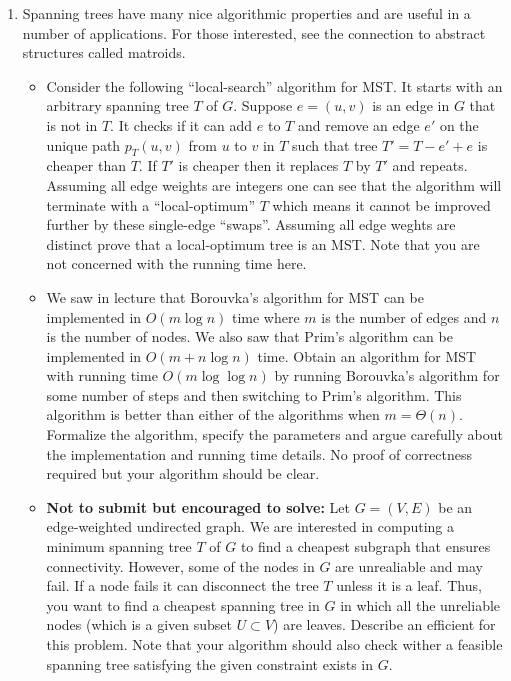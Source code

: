 \documentclass[11pt]{article}
\begin{document}
\vspace{1cm}

\begin{enumerate}



\item Spanning trees have many nice algorithmic properties and are useful
  in a number of applications. For those interested, see the connection
  to abstract structures called matroids.
  \begin{itemize}
  \item Consider the following ``local-search'' algorithm for MST.  It
    starts with an arbitrary spanning tree $T$ of $G$. Suppose
    $e=(u,v)$ is an edge in $G$ that is not in $T$. It checks if it
    can add $e$ to $T$ and remove an edge $e'$ on the unique path
    $p_T(u,v)$ from $u$ to $v$ in $T$ such that tree $T' = T - e' + e$
    is cheaper than $T$.  If $T'$ is cheaper then it replaces $T$ by
    $T'$ and repeats. Assuming all edge weights are integers one can
    see that the algorithm will terminate with a ``local-optimum'' $T$
    which means it cannot be improved further by these single-edge
    ``swaps''.  Assuming all edge weghts are distinct prove that a
    local-optimum tree is an MST. Note that you are not concerned with
    the running time here.
  \item We saw in lecture that Borouvka's algorithm for MST can be
  implemented in $O(m \log n)$ time where $m$ is the number of edges
  and $n$ is the number of nodes. We also saw that Prim's algorithm
  can be implemented in $O(m + n \log n)$ time.
  Obtain an algorithm
    for MST with running time $O(m \log \log n)$ by running Borouvka's
    algorithm for some number of steps and then switching to Prim's
    algorithm. This algorithm is better than either of the algorithms
    when $m = \Theta(n)$. Formalize the algorithm, specify the
    parameters and argue carefully about the implementation and running
    time details. No proof of correctness required but your algorithm should be
    clear.

\item {\bf Not to submit but encouraged to solve:} Let $G=(V,E)$ be an edge-weighted undirected graph.  We are
  interested in computing a minimum spanning tree $T$ of $G$ to find a
  cheapest subgraph that ensures connectivity.  However, some of the
  nodes in $G$ are unrealiable and may fail. If a node fails it can disconnect
  the tree $T$ unless it is a leaf. Thus, you want to find a cheapest
  spanning tree in $G$ in which all the unreliable nodes (which is
  a given subset $U \subset V$) are leaves. Describe an efficient
  for this problem. Note that your algorithm should also check wither
  a feasible spanning tree satisfying the given constraint exists in $G$.
  \end{itemize}


\end{enumerate}
\end{document}
